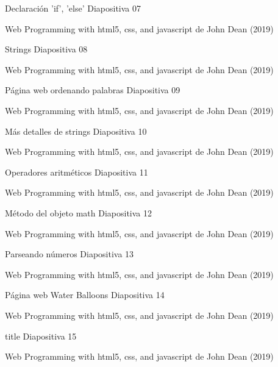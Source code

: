 \begin{frame}{Declaración 'if', 'else'}
\justifying
Diapositiva 07


{\tiny Web Programming with html5, css, and javascript de John Dean (2019)}
\end{frame}

\begin{frame}{Strings}
\justifying
Diapositiva 08


{\tiny Web Programming with html5, css, and javascript de John Dean (2019)}
\end{frame}

\begin{frame}{Página web ordenando palabras}
\justifying
Diapositiva 09


{\tiny Web Programming with html5, css, and javascript de John Dean (2019)}
\end{frame}


\begin{frame}{Más detalles de strings}
\justifying
Diapositiva 10


{\tiny Web Programming with html5, css, and javascript de John Dean (2019)}
\end{frame}

\begin{frame}{Operadores aritméticos}
\justifying
Diapositiva 11


{\tiny Web Programming with html5, css, and javascript de John Dean (2019)}
\end{frame}

\begin{frame}{Método del objeto math}
\justifying
Diapositiva 12


{\tiny Web Programming with html5, css, and javascript de John Dean (2019)}
\end{frame}

\begin{frame}{Parseando números}
\justifying
Diapositiva 13


{\tiny Web Programming with html5, css, and javascript de John Dean (2019)}
\end{frame}

\begin{frame}{Página web Water Balloons}
\justifying
Diapositiva 14


{\tiny Web Programming with html5, css, and javascript de John Dean (2019)}
\end{frame}

\begin{frame}{title}
\justifying
Diapositiva 15


{\tiny Web Programming with html5, css, and javascript de John Dean (2019)}
\end{frame}

